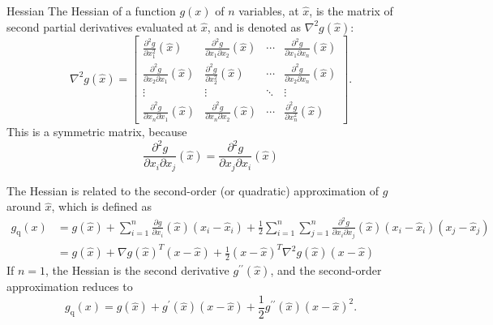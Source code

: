 \begin{definition}
    Hessian The Hessian of a function $ g(x) $ of $ n $ variables, at $ \hat{x} $, is the matrix of second partial derivatives evaluated at $ \hat{x} $, and is denoted as $ \nabla^{2} g(\hat{x}): $
\begin{equation}
\nabla^{2} g(\hat{x})=\left[\begin{array}{cccc}
\frac{\partial^{2} g}{\partial x_{1}^{2}}(\hat{x}) & \frac{\partial^{2} g}{\partial x_{1} \partial x_{2}}(\hat{x}) & \cdots & \frac{\partial^{2} g}{\partial x_{1} \partial x_{n}}(\hat{x}) \\
\frac{\partial^{2} g}{\partial x_{2} \partial x_{1}}(\hat{x}) & \frac{\partial^{2} g}{\partial x_{2}^{2}}(\hat{x}) & \cdots & \frac{\partial^{2} g}{\partial x_{2} \partial x_{n}}(\hat{x}) \\
\vdots & \vdots & \ddots & \vdots \\
\frac{\partial^{2} g}{\partial x_{n} \partial x_{1}}(\hat{x}) & \frac{\partial^{2} g}{\partial x_{n} \partial x_{2}}(\hat{x}) & \cdots & \frac{\partial^{2} g}{\partial x_{n}^{2}}(\hat{x})
\end{array}\right] .
\end{equation}
This is a symmetric matrix, because
\begin{equation}
\frac{\partial^{2} g}{\partial x_{i} \partial x_{j}}(\hat{x})=\frac{\partial^{2} g}{\partial x_{j} \partial x_{i}}(\hat{x})
\end{equation}
\end{definition}

The Hessian is related to the second-order (or quadratic) approximation of $ g $ around $ \hat{x} $, which is defined as
\begin{equation}
\begin{aligned}
g_{\mathrm{q}}(x) &=g(\hat{x})+\sum_{i=1}^{n} \frac{\partial g}{\partial x_{i}}(\hat{x})\left(x_{i}-\hat{x}_{i}\right)+\frac{1}{2} \sum_{i=1}^{n} \sum_{j=1}^{n} \frac{\partial^{2} g}{\partial x_{i} \partial x_{j}}(\hat{x})\left(x_{i}-\hat{x}_{i}\right)\left(x_{j}-\hat{x}_{j}\right) \\
&=g(\hat{x})+\nabla g(\hat{x})^{T}(x-\hat{x})+\frac{1}{2}(x-\hat{x})^{T} \nabla^{2} g(\hat{x})(x-\hat{x})
\end{aligned}
\end{equation}
If $ n=1 $, the Hessian is the second derivative $ g^{\prime \prime}(\hat{x}) $, and the second-order approximation reduces to
\begin{equation}
g_{\mathrm{q}}(x)=g(\hat{x})+g^{\prime}(\hat{x})(x-\hat{x})+\frac{1}{2} g^{\prime \prime}(\hat{x})(x-\hat{x})^{2} .
\end{equation}

